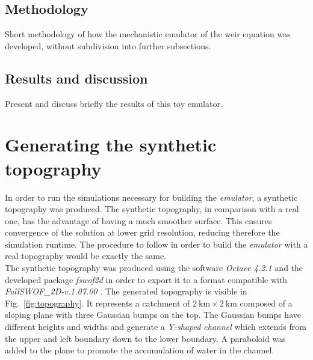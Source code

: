 \subsection{Methodology}

Short methodology of how the mechanistic emulator of the weir equation was developed, without subdivision into further subsections.


\subsection{Results and discussion}

Present and discuss briefly the results of this toy emulator.


\section{Generating the synthetic topography}

In order to run the simulations necessary for building the \textit{emulator}, a synthetic topography was produced.
The synthetic topography, in comparison with a real one, has the advantage of having a much smoother surface.
This ensures convergence of the solution at lower grid resolution, reducing therefore the simulation runtime.
The procedure to follow in order to build the \textit{emulator} with a real topography would be exactly the same.\\

The synthetic topography was produced using the software \textit{Octave 4.2.1}  \autocite{octave_community_gnu_2018} and the developed package \textit{fswof2d}  in order to export it to a format compatible with \textit{FullSWOF\_2D-v.1.07.00} \autocite{delestre_fullswof:_2014} .
The generated topography is visible in Fig.~\ref{fig:topography}.
It represents a catchment of $\SI{2}{\kilo\meter} \times \SI{2}{\kilo\meter}$ composed of a sloping plane with three Gaussian bumps on the top.
The Gaussian bumps have different heights and widths and generate a \emph{Y-shaped channel} which extends from the upper and left boundary down to the lower boundary.
A paraboloid was added to the plane to promote the accumulation of water in the channel.\\


